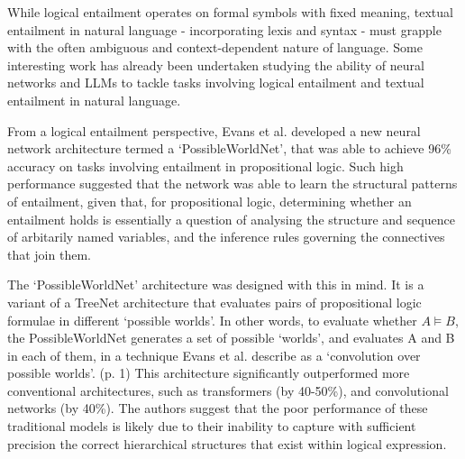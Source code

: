\documentclass[12pt,twoside]{report}
\begin{document}
While logical entailment operates on formal symbols with fixed meaning, textual entailment in natural language - incorporating lexis and syntax - must grapple with the often ambiguous and context-dependent nature of language. Some interesting work has already been undertaken studying the ability of neural networks and LLMs to tackle tasks involving logical entailment and textual entailment in natural language. \newline \par

From a logical entailment perspective, Evans et al. \cite{Evans2018} developed a new neural network architecture termed a `PossibleWorldNet', that was able to achieve 96\% accuracy on tasks involving entailment in propositional logic. Such high performance suggested that the network was able to learn the structural patterns of entailment, given that, for propositional logic, determining whether an entailment holds is essentially a question of analysing the structure and sequence of arbitarily named variables, and the inference rules governing the connectives that join them. \cite{Evans2018} \newline \par

The `PossibleWorldNet' architecture was designed with this in mind. It is a variant of a TreeNet architecture that evaluates pairs of propositional logic formulae in different `possible worlds'. In other words, to evaluate whether $A \models B$, the PossibleWorldNet generates a set of possible `worlds', and evaluates A and B in each of them, in a technique Evans et al. describe as a `convolution over possible worlds'. \cite{Evans2018} (p. 1) This architecture significantly outperformed more conventional architectures, such as transformers (by 40-50\%), and convolutional networks (by 40\%). The authors suggest that the poor performance of these traditional models is likely due to their inability to capture with sufficient precision the correct hierarchical structures that exist within logical expression. \newline \par
\end{document}
